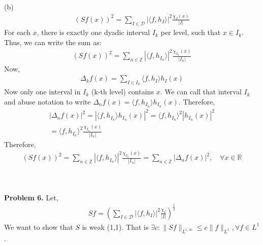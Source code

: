 \documentclass{article}
\newcommand{\R}{\mathbb{R}}
\newcommand{\Z}{\mathbb{Z}}
\newcommand{\D}{\mathcal{D}}
\begin{document}
(b) 
\begin{gather*}
    (Sf(x))^2 = \sum_{I \in \D} |\langle f, h_I\rangle|^2 \frac{\chi_I (x)}{|I|}
\end{gather*}
For each $x$, there is exactly one dyadic interval $I_k$ per level, such that $x \in I_k$. Thus, we can write the sum as:
\begin{gather*}
    (Sf(x))^2 = \sum_{n \in \Z} |\langle f, h_{I_n}\rangle|^2 \frac{\chi_{I_n}(x)}{|I_n|}
\end{gather*}
Now,
\begin{gather*}
    \Delta_k f(x) = \sum_{I \in I_k} \langle f, h_I \rangle h_I (x)
\end{gather*}
Now only one interval in $I_k$ (k-th level) contains $x$. We can call that interval $I_k$ and abuse notation to write $\Delta_n f(x) = \langle f, h_{I_n} \rangle h_{I_n} (x)$. Therefore,
\begin{gather*}
    |\Delta_n f(x)|^2 = |\langle f, h_{I_n} \rangle h_{I_n} (x)|^2 = \langle f, h_{I_n} \rangle^2 |h_{I_n} (x)|^2 \\
    = \langle f, h_{I_n} \rangle^2 \frac{\chi_{I_n}(x)}{|I_n|}
\end{gather*}
Therefore,
\begin{gather*}
    (Sf(x))^2 = \sum_{n \in \Z} |\langle f, h_{I_n}\rangle|^2 \frac{\chi_{I_n}(x)}{|I_n|} = \sum_{n \in \Z} |\Delta_n f(x)|^2, \quad \forall x \in \R
\end{gather*}
\\~

\textbf{Problem 6. } Let,
\begin{gather*}
    Sf = \left( \sum_{I \in \D} |\langle f, h_I\rangle|^2 \frac{\chi_I}{|I|} \right)^{\frac{1}{2}}
\end{gather*}
We want to show that $S$ is weak (1,1). That is $\exists c: \lVert Sf \rVert_{L^{1,\infty}} \leq c \lVert f \rVert_{L^1}, \forall f \in L^1$.
\\~
\end{document}
